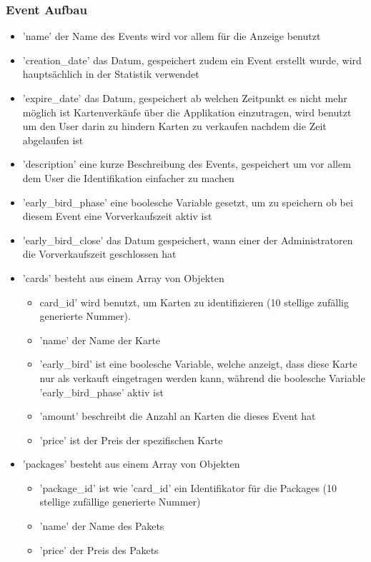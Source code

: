 \subsubsection{Event Aufbau}			
\begin{itemize}
	\item 'name' der Name des Events wird vor allem für die Anzeige benutzt
	\item 'creation\_date' das Datum, gespeichert zudem ein Event erstellt wurde, wird hauptsächlich in der Statistik verwendet
	\item 'expire\_date' das Datum, gespeichert ab welchen Zeitpunkt es nicht mehr möglich ist Kartenverkäufe über die Applikation einzutragen, wird benutzt um den User darin zu hindern Karten zu verkaufen nachdem die Zeit abgelaufen ist
	\item 'description' eine kurze Beschreibung des Events, gespeichert um vor allem dem User die Identifikation einfacher zu machen
	\item 'early\_bird\_phase' eine boolesche Variable gesetzt, um zu speichern ob bei diesem Event eine Vorverkaufszeit aktiv ist
	\item 'early\_bird\_close' das Datum gespeichert, wann einer der Administratoren die Vorverkaufszeit geschlossen hat
	\item 'cards' besteht aus einem Array von Objekten
	\begin{itemize}
		\item card\_id' wird benutzt, um Karten zu identifizieren (10 stellige zufällig generierte Nummer). 
		\item 'name' der Name der Karte
		\item 'early\_bird' ist eine boolesche Variable, welche anzeigt, dass diese Karte nur als verkauft eingetragen werden kann, während die boolesche Variable 'early\_bird\_phase' aktiv ist
		\item 'amount' beschreibt die Anzahl an Karten die dieses Event hat
		\item 'price' ist der Preis der spezifischen Karte
	\end{itemize}
	\item 'packages' besteht aus einem Array von Objekten
	\begin{itemize}
		\item 'package\_id' ist wie 'card\_id' ein Identifikator für die Packages (10 stellige zufällige generierte Nummer)
		\item 'name' der Name des Pakets
		\item 'price' der Preis des Pakets

\end{itemize}
\end{itemize}
